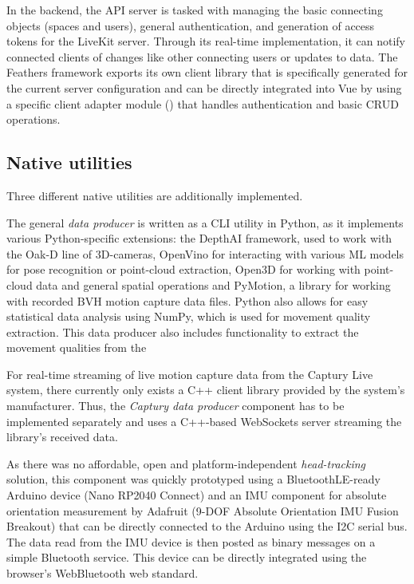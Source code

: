 In the backend, the \ac{API} server is tasked with managing the basic connecting objects (spaces and users), general authentication, and generation of access tokens for the LiveKit server.
Through its real-time implementation, it can notify connected clients of changes like other connecting users or updates to data.
The Feathers framework exports its own client library that is specifically generated for the current server configuration and can be directly integrated into Vue by using a specific client adapter module () that handles authentication and basic \ac{CRUD} operations.

\subsection{Native utilities}

Three different native utilities are additionally implemented.

The general \emph{data producer} is written as a \ac{CLI} utility in Python, as it implements various Python-specific extensions: the DepthAI framework, used to work with the Oak-D line of \ac{3D}-cameras, OpenVino for interacting with various \ac{ML} models for pose recognition or point-cloud extraction, Open3D for working with point-cloud data and general spatial operations and PyMotion, a library for working with recorded \ac{BVH} motion capture data files.
Python also allows for easy statistical data analysis using NumPy, which is used for movement quality extraction.
This data producer also includes functionality to extract the movement qualities from the

For real-time streaming of live motion capture data from the Captury Live system, there currently only exists a C++ client library provided by the system's manufacturer.
Thus, the \emph{Captury data producer} component has to be implemented separately and uses a C++-based WebSockets server streaming the library's received data.

As there was no affordable, open and platform-independent \emph{head-tracking} solution, this component was quickly prototyped using a BluetoothLE-ready Arduino device (Nano RP2040 Connect) and an \ac{IMU} component for absolute orientation measurement by Adafruit (9-DOF Absolute Orientation IMU Fusion Breakout) that can be directly connected to the Arduino using the \ac{I2C} serial bus.
The data read from the \ac{IMU} device is then posted as binary messages on a simple Bluetooth service.
This device can be directly integrated using the browser's WebBluetooth web standard.

